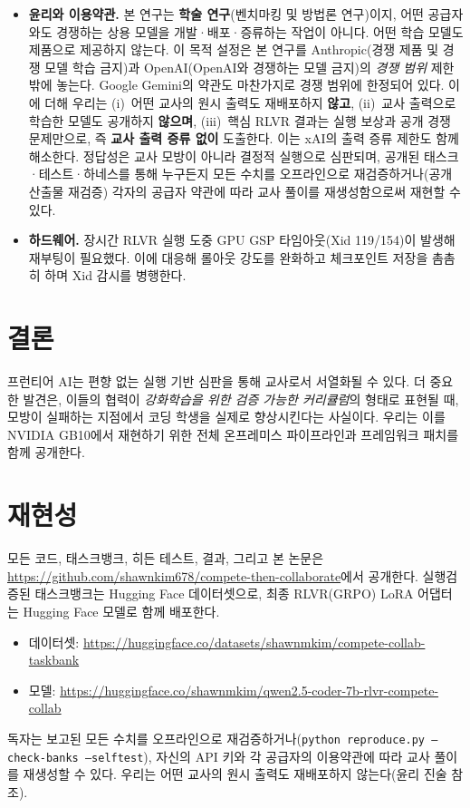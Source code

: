 \documentclass[11pt]{article}
\begin{document}
\begin{itemize}
  \item \textbf{윤리와 이용약관.} 본 연구는 \textbf{학술 연구}(벤치마킹 및 방법론 연구)이지, 어떤 공급자와도 경쟁하는 상용 모델을 개발·배포·증류하는 작업이 아니다. 어떤 학습 모델도 제품으로 제공하지 않는다. 이 목적 설정은 본 연구를 Anthropic(경쟁 제품 및 경쟁 모델 학습 금지)과 OpenAI(OpenAI와 경쟁하는 모델 금지)의 \emph{경쟁 범위} 제한 밖에 놓는다. Google Gemini의 약관도 마찬가지로 경쟁 범위에 한정되어 있다. 이에 더해 우리는 (i)~어떤 교사의 원시 출력도 재배포하지 \textbf{않고}, (ii)~교사 출력으로 학습한 모델도 공개하지 \textbf{않으며}, (iii)~핵심 RLVR 결과는 실행 보상과 공개 경쟁 문제만으로, 즉 \textbf{교사 출력 증류 없이} 도출한다. 이는 xAI의 출력 증류 제한도 함께 해소한다. 정답성은 교사 모방이 아니라 결정적 실행으로 심판되며, 공개된 태스크·테스트·하네스를 통해 누구든지 모든 수치를 오프라인으로 재검증하거나(공개 산출물 재검증) 각자의 공급자 약관에 따라 교사 풀이를 재생성함으로써 재현할 수 있다.

  \item \textbf{하드웨어.} 장시간 RLVR 실행 도중 GPU GSP 타임아웃(Xid 119/154)이 발생해 재부팅이 필요했다. 이에 대응해 롤아웃 강도를 완화하고 체크포인트 저장을 촘촘히 하며 Xid 감시를 병행한다.
\end{itemize}

\section{결론}
프런티어 AI는 편향 없는 실행 기반 심판을 통해 교사로서 서열화될 수 있다. 더 중요한 발견은, 이들의 협력이 \emph{강화학습을 위한 검증 가능한 커리큘럼}의 형태로 표현될 때, 모방이 실패하는 지점에서 코딩 학생을 실제로 향상시킨다는 사실이다. 우리는 이를 NVIDIA GB10에서 재현하기 위한 전체 온프레미스 파이프라인과 프레임워크 패치를 함께 공개한다.

\section*{재현성}
모든 코드, 태스크뱅크, 히든 테스트, 결과, 그리고 본 논문은 \url{https://github.com/shawnkim678/compete-then-collaborate}에서 공개한다. 실행검증된 태스크뱅크는 Hugging Face 데이터셋으로, 최종 RLVR(GRPO) LoRA 어댑터는 Hugging Face 모델로 함께 배포한다.
\begin{itemize}
  \item 데이터셋: \url{https://huggingface.co/datasets/shawnmkim/compete-collab-taskbank}
  \item 모델: \url{https://huggingface.co/shawnmkim/qwen2.5-coder-7b-rlvr-compete-collab}
\end{itemize}
독자는 보고된 모든 수치를 오프라인으로 재검증하거나(\texttt{python reproduce.py --check-banks --selftest}), 자신의 API 키와 각 공급자의 이용약관에 따라 교사 풀이를 재생성할 수 있다. 우리는 어떤 교사의 원시 출력도 재배포하지 않는다(윤리 진술 참조).
\end{document}
